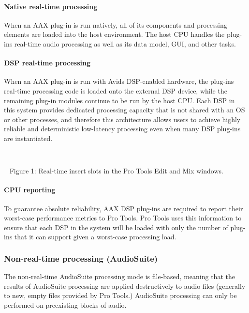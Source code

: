 \hypertarget{a00360_subsubsection__native_realtime_processing_}{}\paragraph{Native real-\/time processing}\label{a00360_subsubsection__native_realtime_processing_}
 When an A\+A\+X plug-\/in is run natively, all of its components and processing elements are loaded into the host environment. The host C\+P\+U handles the plug-\/in\textquotesingle{}s real-\/time audio processing as well as its data model, G\+U\+I, and other tasks.

\hypertarget{a00360_subsubsection__dsp_realtime_processing_}{}\paragraph{D\+S\+P real-\/time processing}\label{a00360_subsubsection__dsp_realtime_processing_}
 When an A\+A\+X plug-\/in is run with Avid\textquotesingle{}s D\+S\+P-\/enabled hardware, the plug-\/in\textquotesingle{}s real-\/time processing code is loaded onto the external D\+S\+P device, while the remaining plug-\/in modules continue to be run by the host C\+P\+U. Each D\+S\+P in this system provides dedicated processing capacity that is not shared with an O\+S or other processes, and therefore this architecture allows users to achieve highly reliable and deterministic low-\/latency processing even when many D\+S\+P plug-\/ins are instantiated.

~

~   Figure 1\+: Real-\/time insert slots in the Pro Tools Edit and Mix windows.

\hypertarget{a00360_subsubsection__cpu_reporting_}{}\paragraph{C\+P\+U reporting}\label{a00360_subsubsection__cpu_reporting_}
 To guarantee absolute reliability, A\+A\+X D\+S\+P plug-\/ins are required to report their worst-\/case performance metrics to Pro Tools. Pro Tools uses this information to ensure that each D\+S\+P in the system will be loaded with only the number of plug-\/ins that it can support given a worst-\/case processing load.

\hypertarget{a00360_subsection__non-real-time_processing_audiosuite}{}\subsubsection{Non-\/real-\/time processing (\+Audio\+Suite)}\label{a00360_subsection__non-real-time_processing_audiosuite}
 The non-\/real-\/time Audio\+Suite processing mode is file-\/based, meaning that the results of Audio\+Suite processing are applied destructively to audio files (generally to new, empty files provided by Pro Tools.) Audio\+Suite processing can only be performed on preexisting blocks of audio.

